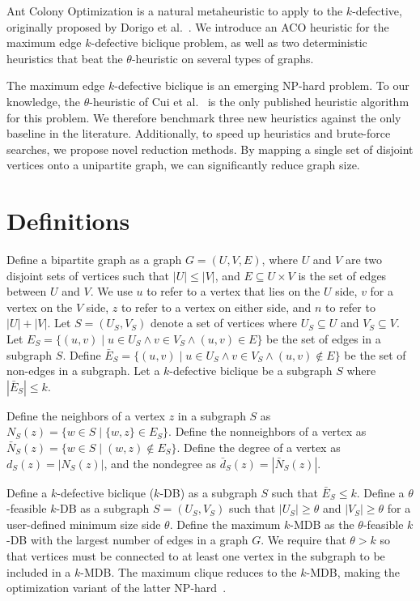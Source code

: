 \documentclass[conference]{IEEEtran}
\begin{document}
Ant Colony Optimization is a natural metaheuristic to apply to the $k$-defective, originally proposed by Dorigo et al.~\cite{dorigo1996}. We introduce an ACO heuristic for the maximum edge $k$-defective biclique problem, as well as two deterministic heuristics that beat the $\theta$-heuristic on several types of graphs.

The maximum edge $k$-defective biclique is an emerging NP-hard problem. To our knowledge, the $\theta$-heuristic of Cui et al.~\cite{cui} is the only published heuristic algorithm for this problem. We therefore benchmark three new heuristics against the only baseline in the literature. Additionally, to speed up heuristics and brute-force searches, we propose novel reduction methods. By mapping a single set of disjoint vertices onto a unipartite graph, we can significantly reduce graph size.

\section{Definitions}

Define a bipartite graph as a graph $G = (U, V, E)$, where $U$ and $V$ are two disjoint sets of vertices such that $|U| \leq |V|$, and $E \subseteq U \times V$ is the set of edges between $U$ and $V$. We use $u$ to refer to a vertex that lies on the $U$ side, $v$ for a vertex on the $V$ side, $z$ to refer to a vertex on either side, and $n$ to refer to $|U| + |V|$. Let $S = (U_S, V_S)$ denote a set of vertices where $U_S \subseteq U$ and $V_S \subseteq V$. Let $E_S = \{(u, v) \mid u \in U_S \wedge v \in V_S \wedge (u, v) \in E \}$ be the set of edges in a subgraph $S$. Define $\bar{E}_S = \{(u, v) \mid u \in U_S \wedge v \in V_S \wedge (u, v) \not\in E \}$ be the set of non-edges in a subgraph. Let a $k$-defective biclique be a subgraph $S$ where $|\bar{E}_S| \leq k$.

Define the neighbors of a vertex $z$ in a subgraph $S$ as $N_S(z) = \{w \in S \mid \{w, z\} \in E_S\}$. Define the nonneighbors of a vertex as $\bar{N}_S(z) = \{w \in S \mid (w, z) \not\in E_S\}$. Define the degree of a vertex as $d_S(z) = |N_S(z)|$, and the nondegree as $\bar{d}_S(z) = |\bar{N}_S(z)|$.

Define a $k$-defective biclique ($k$-DB) as a subgraph $S$ such that $\bar{E}_S \leq k$. Define a $\theta$-feasible $k$-DB as a subgraph $S = (U_S, V_S)$ such that $|U_S| \geq \theta$ and $|V_S| \geq \theta$ for a user-defined minimum size side $\theta$. Define the maximum $k$-MDB as the $\theta$-feasible $k$-DB with the largest number of edges in a graph $G$. We require that $\theta > k$ so that vertices must be connected to at least one vertex in the subgraph to be included in a $k$-MDB. The maximum clique reduces to the $k$-MDB, making the optimization variant of the latter NP-hard~\cite{cui}.
\end{document}
